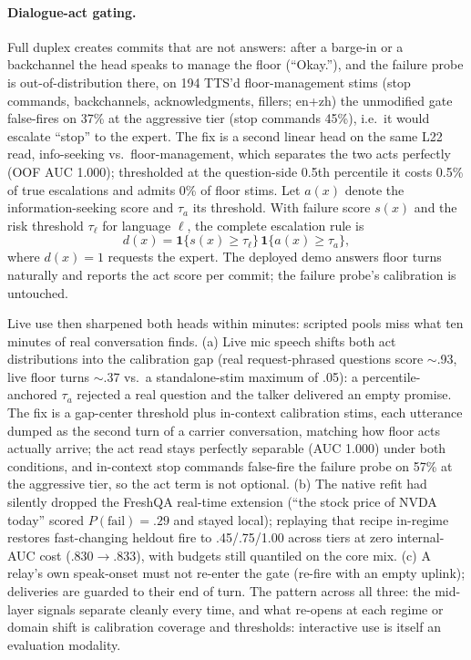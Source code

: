 \paragraph{Dialogue-act gating.}
\label{app:actgate}
Full duplex creates commits that are
not answers: after a barge-in or a backchannel the head speaks to
manage the floor (``Okay.''), and the failure probe is
out-of-distribution there, on 194 TTS'd floor-management stims
(stop commands, backchannels, acknowledgments, fillers; en+zh) the
unmodified gate false-fires on 37\% at the aggressive tier (stop
commands 45\%), i.e.\ it would escalate ``stop'' to the expert. The
fix is a second linear head on the same L22 read,
info-seeking vs.\ floor-management, which separates the two acts
perfectly (OOF AUC 1.000); thresholded at the question-side 0.5th
percentile it costs 0.5\% of true escalations and admits 0\% of floor
stims. Let $a(x)$ denote the information-seeking score and $\tau_a$
its threshold. With failure score $s(x)$ and the risk threshold
$\tau_{\ell}$ for language $\ell$, the complete escalation rule is
\begin{equation}
 d(x)=\mathbf{1}\{s(x)\geq\tau_{\ell}\}\,
       \mathbf{1}\{a(x)\geq\tau_a\},
 \label{eq:jointgate}
\end{equation}
where $d(x)=1$ requests the expert. The deployed demo answers floor
turns naturally and reports the act score per
commit; the failure probe's calibration is untouched.

Live use then sharpened both heads within minutes: scripted pools
miss what ten minutes of real conversation finds. (a) Live mic speech
shifts both act distributions into the calibration gap (real
request-phrased questions score $\sim$.93, live floor turns $\sim$.37
vs.\ a standalone-stim maximum of .05): a percentile-anchored
$\tau_a$ rejected a real question and the talker delivered an empty
promise. The fix is a gap-center threshold plus in-context
calibration stims, each utterance dumped as the second turn of a
carrier conversation, matching how floor acts actually arrive; the
act read stays perfectly separable (AUC 1.000) under both conditions,
and in-context stop commands false-fire the failure probe on
57\% at the aggressive tier, so the act term is not optional. (b) The
native refit had silently dropped the FreshQA real-time extension
(``the stock price of NVDA today'' scored $P(\mathrm{fail}){=}.29$
and stayed local); replaying that recipe in-regime restores
fast-changing heldout fire to .45/.75/1.00 across tiers at zero
internal-AUC cost (.830$\to$.833), with budgets still quantiled on
the core mix. (c) A relay's own speak-onset must not re-enter the
gate (re-fire with an empty uplink); deliveries are guarded to their
end of turn. The pattern across all three: the mid-layer signals
separate cleanly every time, and what re-opens at each regime or
domain shift is calibration coverage and thresholds: interactive
use is itself an evaluation modality.

